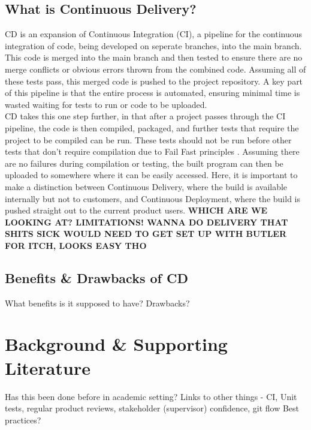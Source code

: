 \documentclass[lettersize,journal]{IEEEtran}
\begin{document}
    \subsection{What is Continuous Delivery?}
        CD is an expansion of Continuous Integration (CI), a pipeline for the continuous integration of code, being developed on seperate branches, into the main branch. This code is merged into the main branch and then tested to ensure there are no merge conflicts or obvious errors thrown from the combined code. Assuming all of these tests pass, this merged code is pushed to the project repository. A key part of this pipeline is that the entire process is automated, ensuring minimal time is wasted waiting for tests to run or code to be uploaded. \cite{ContDelIntro,CICDCD} \\
        CD takes this one step further, in that after a project passes through the CI pipeline, the code is then compiled, packaged, and further tests that require the project to be compiled can be run. These tests should not be run before other tests that don't require compilation due to Fail Fast principles \cite{shore2004fail,bamboo}. Assuming there are no failures during compilation or testing, the built program can then be uploaded to somewhere where it can be easily accessed. Here, it is important to make a distinction between Continuous Delivery, where the build is available internally but not to customers, and Continuous Deployment, where the build is pushed straight out to the current product users. \textbf{WHICH ARE WE LOOKING AT? LIMITATIONS! WANNA DO DELIVERY THAT SHITS SICK WOULD NEED TO GET SET UP WITH BUTLER FOR ITCH, LOOKS EASY THO}

    \subsection{Benefits \& Drawbacks of CD}
    What benefits is it supposed to have\cite{ContDelIntro,paddy}? 
    Drawbacks\cite{paddy}? 
    
\section{Background \& Supporting Literature}
    Has this been done before in academic setting\cite{CDCourse2014,CDMobileDev,Tornado,IndustryAcademyDenmark}? 
    Links to other things - CI\cite{CICDCD}, Unit tests, regular product reviews, stakeholder (supervisor) confidence, git flow \cite{gitBranching}
    Best practices\cite{duvall2007continuous}? 
\end{document}
